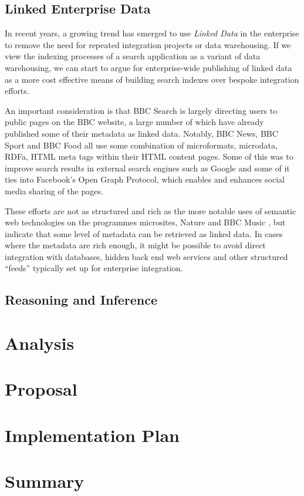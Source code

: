 \documentclass[10pt,a4paper]{report}
\begin{document}
\section{Linked Enterprise Data}

In recent years, a growing trend has emerged to use
\emph{Linked Data} in the enterprise to remove the need
for repeated integration projects or data warehousing.
\cite{allemang2010semantic} If we view the indexing processes
of a search application as a variant of data warehousing,
we can start to argue for enterprise-wide publishing of
linked data as a more cost effective means of building search
indexes over bespoke integration efforts.

An important consideration is that BBC Search is largely directing
users to public pages on the BBC website, a large number of which have
already published some of their metadata as linked data. Notably, BBC News,
BBC Sport and BBC Food all use some combination
of microformats, microdata, RDFa, HTML meta tags within their HTML content
pages. Some of this was to improve search results in external search engines
such as Google and some of it ties into Facebook's Open Graph Protocol, which
enables and enhances social media sharing of the pages.

These efforts are not as structured and rich as the more notable uses
of semantic web technologies on the programmes microsites, Nature and BBC
Music \cite{raimond2010use}, but indicate that some level of metadata
can be retrieved
as linked data. In cases where the metadata are rich enough, it might be
possible to avoid direct integration with databases, hidden back end
web services and other structured ``feeds'' typically set up for enterprise
integration.

\section{Reasoning and Inference}

\chapter{Analysis}

\chapter{Proposal}

\chapter{Implementation Plan}

\chapter{Summary}



\end{document}
